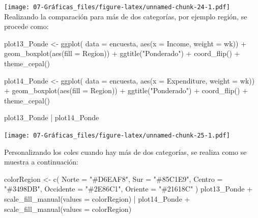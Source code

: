 \documentclass[
  12pt,
]{book}
\newenvironment{Shaded}{\begin{snugshade}}{\end{snugshade}}
\newcommand{\AttributeTok}[1]{\textcolor[rgb]{0.77,0.63,0.00}{#1}}
\newcommand{\FunctionTok}[1]{\textcolor[rgb]{0.00,0.00,0.00}{#1}}
\newcommand{\NormalTok}[1]{#1}
\newcommand{\OtherTok}[1]{\textcolor[rgb]{0.56,0.35,0.01}{#1}}
\newcommand{\SpecialCharTok}[1]{\textcolor[rgb]{0.00,0.00,0.00}{#1}}
\newcommand{\StringTok}[1]{\textcolor[rgb]{0.31,0.60,0.02}{#1}}
\begin{document}
\texttt{[image: 07-Gráficas\_files/figure-latex/unnamed-chunk-24-1.pdf]}
Realizando la comparación para más de dos categorías, por ejemplo región, se procede como:

\begin{Shaded}
\begin{Highlighting}[]
\NormalTok{plot13\_Ponde }\OtherTok{\textless{}{-}} \FunctionTok{ggplot}\NormalTok{(}
  \AttributeTok{data =}\NormalTok{ encuesta,}
  \FunctionTok{aes}\NormalTok{(}\AttributeTok{x =}\NormalTok{ Income, }\AttributeTok{weight =}\NormalTok{ wk)) }\SpecialCharTok{+}
  \FunctionTok{geom\_boxplot}\NormalTok{(}\FunctionTok{aes}\NormalTok{(}\AttributeTok{fill =}\NormalTok{ Region)) }\SpecialCharTok{+}
  \FunctionTok{ggtitle}\NormalTok{(}\StringTok{"Ponderado"}\NormalTok{) }\SpecialCharTok{+}
  \FunctionTok{coord\_flip}\NormalTok{() }\SpecialCharTok{+}
  \FunctionTok{theme\_cepal}\NormalTok{()}

\NormalTok{plot14\_Ponde }\OtherTok{\textless{}{-}} \FunctionTok{ggplot}\NormalTok{(}
  \AttributeTok{data =}\NormalTok{ encuesta,}
  \FunctionTok{aes}\NormalTok{(}\AttributeTok{x =}\NormalTok{ Expenditure, }\AttributeTok{weight =}\NormalTok{ wk)) }\SpecialCharTok{+}
  \FunctionTok{geom\_boxplot}\NormalTok{(}\FunctionTok{aes}\NormalTok{(}\AttributeTok{fill =}\NormalTok{ Region)) }\SpecialCharTok{+}
  \FunctionTok{ggtitle}\NormalTok{(}\StringTok{"Ponderado"}\NormalTok{) }\SpecialCharTok{+}
  \FunctionTok{coord\_flip}\NormalTok{() }\SpecialCharTok{+}
  \FunctionTok{theme\_cepal}\NormalTok{()}

\NormalTok{plot13\_Ponde }\SpecialCharTok{|}\NormalTok{ plot14\_Ponde}
\end{Highlighting}
\end{Shaded}

\texttt{[image: 07-Gráficas\_files/figure-latex/unnamed-chunk-25-1.pdf]}

Personalizando los coles cuando hay más de dos categorías, se realiza como se muestra a continuación:

\begin{Shaded}
\begin{Highlighting}[]
\NormalTok{colorRegion }\OtherTok{\textless{}{-}} \FunctionTok{c}\NormalTok{(}
  \AttributeTok{Norte =} \StringTok{"\#D6EAF8"}\NormalTok{, }\AttributeTok{Sur =} \StringTok{"\#85C1E9"}\NormalTok{,}
  \AttributeTok{Centro =} \StringTok{"\#3498DB"}\NormalTok{, }\AttributeTok{Occidente =} \StringTok{"\#2E86C1"}\NormalTok{, }\AttributeTok{Oriente =} \StringTok{"\#21618C"}
\NormalTok{)}
\NormalTok{plot13\_Ponde }\SpecialCharTok{+} \FunctionTok{scale\_fill\_manual}\NormalTok{(}\AttributeTok{values =}\NormalTok{ colorRegion) }\SpecialCharTok{|}
\NormalTok{plot14\_Ponde }\SpecialCharTok{+} \FunctionTok{scale\_fill\_manual}\NormalTok{(}\AttributeTok{values =}\NormalTok{ colorRegion)}
\end{Highlighting}
\end{Shaded}
\end{document}
